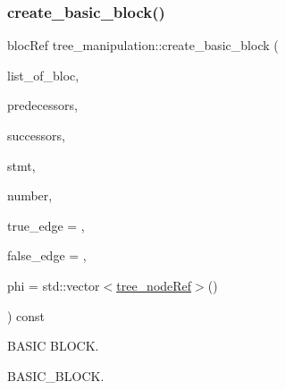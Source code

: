 \mbox{\label{classtree__manipulation_ac2f64a60bbbded67d811757e0dce2461}} 
\subsubsection{\texorpdfstring{create\+\_\+basic\+\_\+block()}{create\_basic\_block()}}
{\footnotesize\ttfamily bloc\+Ref tree\+\_\+manipulation\+::create\+\_\+basic\+\_\+block (\begin{DoxyParamCaption}\item[{std\+::map$<$ unsigned int, bloc\+Ref $>$ \&}]{list\+\_\+of\+\_\+bloc,  }\item[{std\+::vector$<$ unsigned int $>$}]{predecessors,  }\item[{std\+::vector$<$ unsigned int $>$}]{successors,  }\item[{std\+::vector$<$ \hyperlink{tree__node_8hpp_a6ee377554d1c4871ad66a337eaa67fd5}{tree\+\_\+node\+Ref} $>$}]{stmt,  }\item[{unsigned int}]{number,  }\item[{unsigned int}]{true\+\_\+edge = {},  }\item[{unsigned int}]{false\+\_\+edge = {},  }\item[{std\+::vector$<$ \hyperlink{tree__node_8hpp_a6ee377554d1c4871ad66a337eaa67fd5}{tree\+\_\+node\+Ref} $>$}]{phi = {\ttfamily std\+:\+:vector$<$\hyperlink{tree__node_8hpp_a6ee377554d1c4871ad66a337eaa67fd5}{tree\+\_\+node\+Ref}$>$()} }\end{DoxyParamCaption}) const}



B\+A\+S\+IC B\+L\+O\+CK. 

B\+A\+S\+I\+C\+\_\+\+B\+L\+O\+CK.

